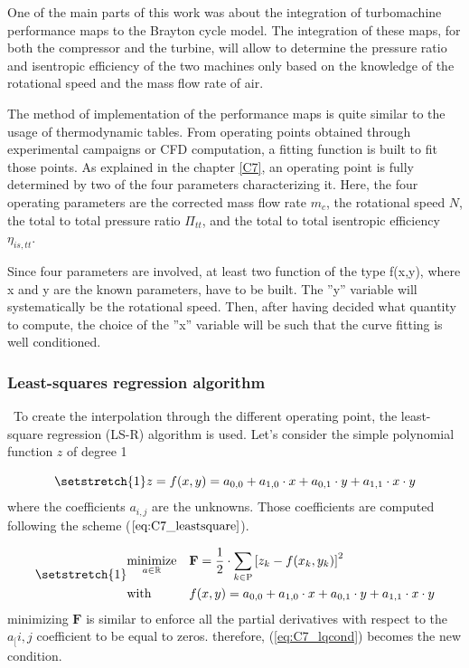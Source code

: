 One of the main parts of this work was about the integration of turbomachine performance maps to the Brayton cycle model. The integration of these maps, for both the compressor and the turbine, will allow to determine the pressure ratio and isentropic efficiency of the two machines only based on the knowledge of the rotational speed and the mass flow rate of air.

The method of implementation of the performance maps is quite similar to the usage of thermodynamic tables. From operating points obtained through experimental campaigns or CFD computation, a fitting function is built to fit those points. As explained in the chapter \ref{C7}, an operating point is fully determined by two of the four parameters characterizing it. Here, the four operating parameters are the corrected mass flow rate $m_c$, the rotational speed $N$, the total to total pressure ratio $\Pi_{tt}$, and the total to total isentropic efficiency $\eta_{is,tt}$. 

Since four parameters are involved, at least two function of the type f(x,y), where x and y are the known parameters, have to be built. The ''y'' variable will systematically be the rotational speed. Then, after having decided what quantity to compute, the choice of the ''x'' variable will be such that the curve fitting is well conditioned.
\subsubsection{Least-squares regression algorithm}
\quad\ To create the interpolation through the different operating point, the least-square regression (LS-R) algorithm is used. Let's consider the simple polynomial function $z$ of degree 1

\begin{equation*}
    \setstretch{1}
    z = f(x,y) = a_{0,0} + a_{1,0}\cdot x + a_{0,1}\cdot y + a_{1,1}\cdot x\cdot y
\end{equation*}
where the coefficients $a_{i,j}$ are the unknowns. Those coefficients are computed following the scheme ($\ref{eq:C7_leastsquare}$). 

\begin{equation}
\setstretch{1}
\begin{aligned}
& \underset{a\in\mathbb{R}}{\text{minimize}}
& &  \textbf{F} = \frac{1}{2}\cdot\sum_{k\in\textsc{P}}\left[z_k - f(x_k, y_k) \right]^2 \\
& \text{with}
& & f(x, y) = a_{0,0} + a_{1,0}\cdot x + a_{0,1}\cdot y + a_{1,1}\cdot x\cdot y
\end{aligned}\label{eq:C7_leastsquare}
\end{equation}
minimizing $\textbf{F}$ is similar to enforce all the partial derivatives with respect to the $a_[{i,j}$ coefficient to be equal to zeros. therefore, (\ref{eq:C7_lqcond}) becomes the new condition.


